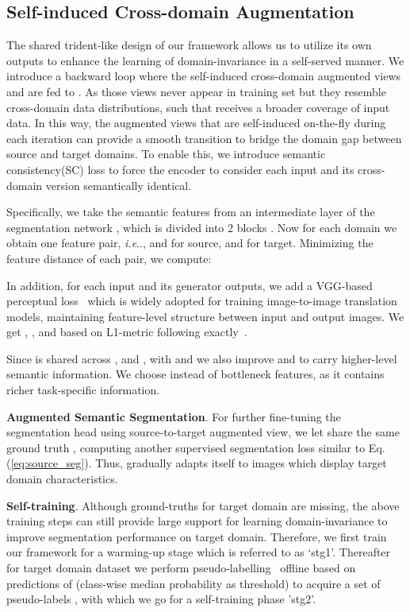 \documentclass{bmvc2k}
\makeatletter
\DeclareRobustCommand\onedot{\futurelet\@let@token\@onedot}
\def\@onedot{\ifx\@let@token.\else.\null\fi\xspace}
\def\ie{\emph{i.e}\onedot} \def\Ie{\emph{I.e}\onedot}
\newcommand{\Eq}[1]{Eq. (\ref{eq:#1})}
\makeatother
\begin{document}
\subsection{Self-induced Cross-domain Augmentation}
\label{sec:self_induced}
The shared trident-like design of our framework allows us to utilize its own outputs to enhance the learning of domain-invariance in a self-served manner. We introduce a backward loop where the self-induced cross-domain augmented views  and  are fed to . As those views never appear in training set but they resemble cross-domain data distributions, such that  receives a broader coverage of input data. In this way, the augmented views that are self-induced on-the-fly during each iteration can provide a smooth transition to bridge the domain gap between source and target domains. To enable this, we introduce semantic consistency(SC) loss  to force the encoder to consider each input and its cross-domain version semantically identical. 

Specifically, we take the semantic features from an intermediate layer of the segmentation network , which is divided into 2 blocks . Now for each domain we obtain one feature pair, \ie,
 and  for source,  and  for target. 
Minimizing the feature distance of each pair, we compute:


In addition, for each input and its generator outputs, we add a VGG-based perceptual loss~\cite{johnson2016perceptual} which is widely adopted for training image-to-image translation models, maintaining feature-level structure between input and output images. We get , ,  and  based on L1-metric following exactly~\cite{johnson2016perceptual}.

Since  is shared across ,  and , with  and  we also improve  and  to carry higher-level semantic information. We choose  instead of  bottleneck features, as it contains richer task-specific information. 



\noindent\textbf{Augmented Semantic Segmentation}.
For further fine-tuning the segmentation head using source-to-target augmented view, we let  share the same ground truth , computing another supervised segmentation loss  similar to \Eq{source_seg}. Thus,  gradually adapts itself to images which display target domain characteristics.

\noindent\textbf{Self-training}.
Although ground-truths for target domain are missing, the above training steps can still provide large support for learning domain-invariance to improve segmentation performance on target domain. Therefore, we first train our framework for a warming-up stage which is referred to as `stg1'. Thereafter for target domain dataset we perform pseudo-labelling~\cite{li2019bidirectional} offline based on predictions of  (class-wise median probability as threshold) to acquire a set of pseudo-labels , with which we go for a self-training phase 'stg2'.
\end{document}
